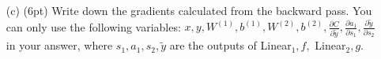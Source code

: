 \documentclass{article}
\begin{document}
\begin{itemize}
    \item[(c)] (6pt) Write down the gradients calculated from the backward pass. You can only use the following variables: $x, y, W^{(1)}, b^{(1)}, W^{(2)}, b^{(2)}, \frac{\partial C}{\partial \tilde{y}}, \frac{\partial a_1}{\partial s_1}, \frac{\partial \tilde{y}}{\partial s_2}$ in your answer, where $s_1, a_1, s_2, \tilde{y}$ are the outputs of Linear$_1, f, $ Linear$_2, g$.
    
    
    

\end{itemize}
\end{document}
